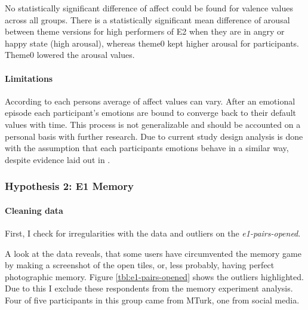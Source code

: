 	No statistically significant difference of affect could be found for valence values across all groups. There is a statistically significant mean difference of arousal between theme versions for high performers of E2 when they are in angry or happy state (high arousal), whereas theme0 kept higher arousal for participants. Theme0 lowered the arousal values.
	
	\paragraph{Limitations} According to \cite{Russell2003} each persons average of affect values can vary. After an emotional episode each participant's emotions are bound to converge back to their default values with time. This process is not generalizable and should be accounted on a personal basis with further research. Due to current study design analysis is done with the assumption that each participants emotions behave in a similar way, despite evidence laid out in \cite{Russell2003}.
	

%	


	\subsubsection{Hypothesis 2: E1 Memory} \label{section:h2e1}
	
		\paragraph{Cleaning data} %
		
		First, I check for irregularities with the data and outliers on the \textit{e1-pairs-opened}.
		
		A look at the data reveals, that some users have circumvented the memory game by making a screenshot of the open tiles, or, less probably, having perfect photographic memory. Figure \ref{tbl:e1-pairs-opened} shows the outliers highlighted. Due to this I exclude these respondents from the memory experiment analysis. Four of five participants in this group came from MTurk, one from social media.
		
